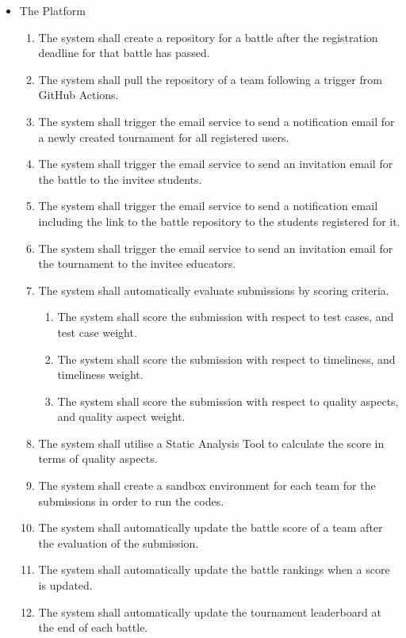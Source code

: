 \begin{itemize}
 \item The Platform
  \begin{enumerate}[resume]
  \item The system shall create a repository for a battle after the registration deadline for that battle has passed.
     \item The system shall pull the repository of a team following a trigger from GitHub Actions.
    \item The system shall trigger the email service to send a notification email for a newly created tournament for all registered users.
    \item The system shall trigger the email service to send an invitation email for the battle to the invitee students.
    \item The system shall trigger the email service to send a notification email including the link to the battle repository to the students registered for it.
    \item The system shall trigger the email service to send an invitation email for the tournament to the invitee educators.
     \item The system shall automatically evaluate submissions by scoring criteria.
     \begin{enumerate}
         \item The system shall score the submission with respect to test cases, and test case weight.
         \item The system shall score the submission with respect to timeliness, and timeliness weight.
         \item The system shall score the submission with respect to quality aspects, and quality aspect weight.
     \end{enumerate}
     \item The system shall utilise a Static Analysis Tool to calculate the score in terms of quality aspects.
     \item The system shall create a sandbox environment for each team for the submissions in order to run the codes.
     \item The system shall automatically update the battle score of a team after the evaluation of the submission.
     \item The system shall automatically update the battle rankings when a score is updated.
     \item The system shall automatically update the tournament leaderboard at the end of each battle.
 \end{enumerate}
 
\end{itemize}

